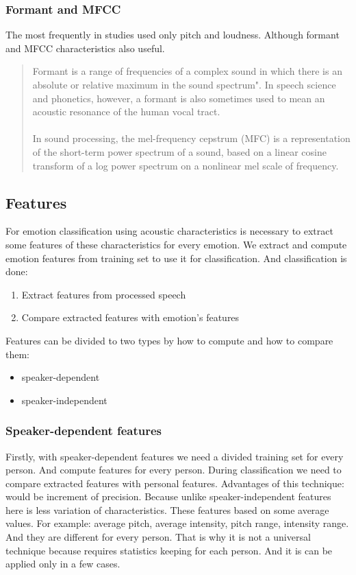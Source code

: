 \documentclass[12pt, letterpaper]{article}
\begin{document}
\subsubsection{Formant and MFCC}
The most frequently in studies used only pitch and loudness. Although formant and MFCC characteristics also useful.
\begin{quote}
Formant is a range of frequencies of a complex sound in which there is an absolute or relative maximum in the sound spectrum". In speech science and phonetics, however, a formant is also sometimes used to mean an acoustic resonance of the human vocal tract.\cite{wiki2}
\\
\\
In sound processing, the mel-frequency cepstrum (MFC) is a representation of the short-term power spectrum of a sound, based on a linear cosine transform of a log power spectrum on a nonlinear mel scale of frequency\cite{wiki3}.
\end{quote}


\subsection{Features}
For emotion classification using acoustic characteristics is necessary to extract some features of these characteristics for every emotion. We extract and compute emotion features from training set to use it for classification. And classification is done:
\begin{enumerate}
	\item Extract features from processed speech
	\item Compare extracted features with emotion's features
\end{enumerate}

Features can be divided to two types by how to compute and how to compare them:
\begin{itemize}
	\item speaker-dependent
	\item speaker-independent
\end{itemize}

\subsubsection{Speaker-dependent features}
Firstly, with speaker-dependent features we need a divided training set for every person. And compute features for every person. During classification we need to compare extracted features with personal features. Advantages of this technique: would be increment of precision. Because unlike speaker-independent features here is less variation of characteristics. These features based on some average values. For example: average pitch, average intensity, pitch range, intensity range. And they are different for every person. That is why it is not a universal technique because requires statistics keeping for each person. And it is can be applied only in a few cases.
\end{document}
